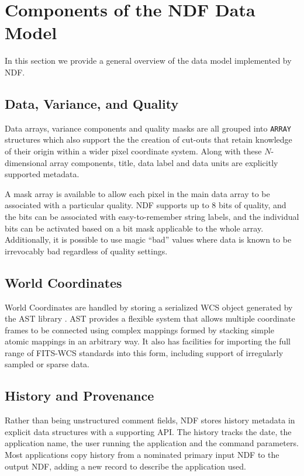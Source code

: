 \documentclass[11pt,twoside]{article}
\begin{document}
\section{Components of the NDF Data Model}

In this section we provide a general overview of the data model
implemented by NDF.

\subsection{Data, Variance, and Quality}

Data arrays, variance components and quality masks are all grouped
into \texttt{ARRAY} structures which also support the the creation of
cut-outs that retain knowledge of their origin within a wider pixel
coordinate system.  Along with these $N$-dimensional array components,
title, data label and data units are explicitly supported metadata.

A mask array is available to allow each pixel in the main data array
to be associated with a particular quality. NDF supports up to 8 bits
of quality, and the bits can be associated with easy-to-remember
string labels, and the individual bits can be activated based on a bit
mask applicable to the whole array. Additionally, it is possible to
use magic ``bad'' values where data is known to be irrevocably bad
regardless of quality settings.

\subsection{World Coordinates}

World Coordinates are handled by storing a serialized WCS object
generated by the AST library \citep{1998ASPC..145...41W}. AST provides
a flexible system that allows multiple coordinate frames to be
connected using complex mappings formed by stacking simple atomic
mappings in an arbitrary way. It also has facilities for importing the
full range of FITS-WCS standards \citep[see
e.g.][]{2006A&A...446..747G,2012ASPC..461..825B} into this form,
including support of irregularly sampled or sparse data.

\subsection{History and Provenance}

Rather than being unstructured comment fields, NDF stores history
metadata in explicit data structures with a supporting API. The
history tracks the date, the application name, the user running the
application and the command parameters. Most applications copy history
from a nominated primary input NDF to the output NDF, adding a new
record to describe the application used.
\end{document}
